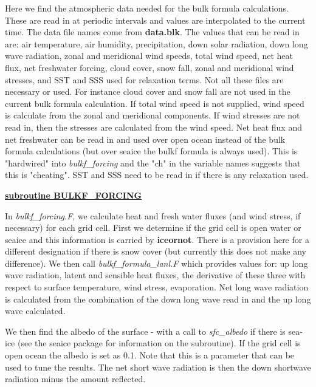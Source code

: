 \noindent
Here we find the atmospheric data needed for the bulk formula
calculations. These are read in at periodic intervals and
values are interpolated to the current time. The data file names
come from {\bf data.blk}. The values that can be read in are:
air temperature, air humidity, precipitation, 
down solar radiation, down long
wave radiation, zonal and meridional wind speeds, total wind
speed, net heat flux, net freshwater forcing, cloud cover,
snow fall, zonal and meridional wind stresses, and SST and SSS
used for relaxation terms.
Not all these files are necessary or used. For instance cloud
cover and snow fall are not used in the current bulk formula
calculation. If total wind speed is not supplied, wind speed
is calculate from the zonal and meridional components. If
wind stresses are not read in, then the stresses are calculated
from the wind speed. Net heat flux and net freshwater can be
read in and used over open ocean instead of the bulk formula
calculations (but over seaice the bulkf formula is always
used). This is "hardwired" into {\it bulkf\_forcing} and
the "ch" in the variable names suggests that this is "cheating".
SST and SSS need to be read in if there is any relaxation used.




\vspace{1cm}
\noindent
{\bf \underline{subroutine BULKF\_FORCING}}

\noindent
In {\it bulkf\_forcing.F}, we calculate  heat and fresh water
fluxes (and wind stress, if necessary) for each grid cell.
First we determine if the grid cell is open water or seaice
and this information is carried by {\bf iceornot}. There is
a provision here for a different designation if there is
snow cover (but currently this does not make any difference).
We then call {\it bulkf\_formula\_lanl.F} which provides
values for: up long wave radiation, latent and sensible heat
fluxes, the derivative of these three with respect to surface
temperature, wind stress, evaporation. 
Net long wave radiation is calculated from the combination
of the down long wave read in and the up long wave calculated.

We then find the albedo of the surface - with a call to
{\it sfc\_albedo} if there is sea-ice (see the seaice package
for information on the subroutine). If the grid cell is open
ocean the albedo is set as 0.1. Note that this is a parameter
that can be used to tune the results. The net short wave
radiation is then the down shortwave radiation minus the 
amount reflected.

